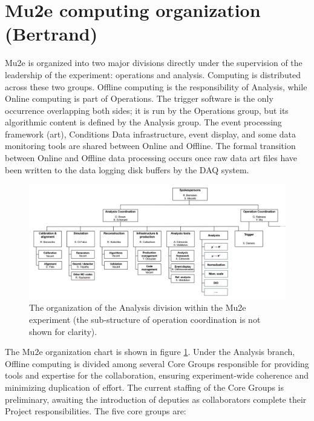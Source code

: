 \section{Mu2e computing organization (Bertrand)}
\label{sec:mu2eorg}
Mu2e is organized into two major divisions directly under the supervision of the leadership of the experiment: operations and analysis. Computing is distributed across these two groups. Offline computing is the responsibility of Analysis, while Online computing is part of Operations. The trigger software is the only occurrence overlapping both sides; it is run by the Operations group, but its algorithmic content is defined by the Analysis group.  The event processing framework (art), Conditions Data infrastructure, event display, and some data monitoring tools are shared between Online and Offline. The formal transition between Online and Offline data processing occurs once raw data art files have been written to the data logging disk buffers by the DAQ system.

\begin{figure}[htb]
\begin{center}
\includegraphics[width=0.9\linewidth]{figures/ACOrgChart.png}
\caption{The organization of the Analysis division within the Mu2e experiment (the sub-structure of operation coordination is not shown for clarity). }
\label{fig:orgchart}
\end{center}
\end{figure}

The Mu2e organization chart is shown in figure \ref{fig:orgchart}. Under the Analysis branch, Offline computing is divided among several Core Groups responsible for providing tools and expertise for the collaboration, ensuring experiment-wide coherence and minimizing duplication of effort. The current staffing of the Core Groups is preliminary, awaiting the introduction of deputies as collaborators complete their Project responsibilities. The five core groups are: 


